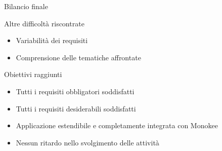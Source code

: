 \begin{tframe}{Bilancio finale}
\begin{block}{Altre difficoltà riscontrate}
\begin{itemize}
\item Variabilità dei requisiti
\item Comprensione delle tematiche affrontate
\end{itemize}
\end{block}
\begin{block}{Obiettivi raggiunti}
\begin{itemize}
\item Tutti i requisiti obbligatori soddisfatti
\item Tutti i requisiti desiderabili soddisfatti
\item Applicazione estendibile e completamente integrata con Monokee
\item Nessun ritardo nello svolgimento delle attività
\end{itemize}
\end{block}
\end{tframe}